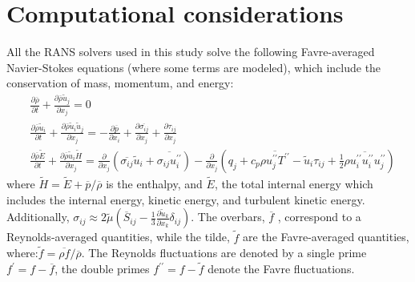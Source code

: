 \documentclass[journal ]{new-aiaa}
\begin{document}
\section{Computational considerations}
All the RANS solvers used in this study solve the following Favre-averaged Navier-Stokes equations \cite{Menter1994SST} (where some terms are modeled), which include the conservation of mass, momentum, and energy:
\begin{align}
    &\frac{\partial \overline{\rho}}{\partial t} + \frac{\partial \overline{\rho} \tilde{u}_j }{\partial x_j}  = 0 \\
    &\frac{\partial \overline{\rho} \tilde{u}_i}{\partial t}   + \frac{\partial \overline{\rho} \tilde{u}_i \tilde{u}_j}{\partial x_j}   = - \frac{\partial \overline{p}}{\partial x_i} + \frac{\partial \overline{\sigma_{ij}}}{\partial x_j}   + \frac{\partial \tau_{ij}}{\partial x_j} \\
    &\frac{\partial \overline{\rho} \tilde{E}}{\partial t}   + \frac{\partial \overline{\rho} \tilde{u}_i \tilde{H}}{\partial x_j}   = \frac{\partial}{\partial x_j} \left( \overline{\sigma_{ij}} \tilde{u}_i + \overline{\sigma_{ij} u^{\prime\prime}_i} \right) - \frac{\partial}{\partial x_j} \left( q_j + c_p \overline{\rho u^{\prime\prime}_j T^{\prime\prime}} - \tilde{u}_i \tau_{ij} + \frac{1}{2} \overline{\rho u_i^{\prime\prime}u_i^{\prime\prime}u_j^{\prime\prime}}\right)
    \label{eq:NS-E}
\end{align}
where $\tilde{H} = \tilde{E} + \overline{p}/\overline{\rho}$ is the enthalpy, and $\tilde{E}$, the total internal energy which includes the internal energy, kinetic energy, and turbulent kinetic energy. Additionally, $\sigma_{ij} \approx 2 \tilde{\mu} \left(\overline{S}_{ij} - \frac{1}{3} \frac{\partial \tilde{u}_k}{\partial x_k} \delta_{ij} \right)$. The overbars, $\overline{f}$ , correspond to a Reynolds-averaged quantities, while the tilde, $\tilde{f}$ are the Favre-averaged quantities, where:$\tilde{f} = \overline{\rho f}/\overline{\rho}$. The Reynolds fluctuations are denoted by a single prime $f^{\prime} = f - \overline{f}$, the double primes $f^{\prime\prime} = f - \tilde{f}$ denote the Favre fluctuations. 
\end{document}

